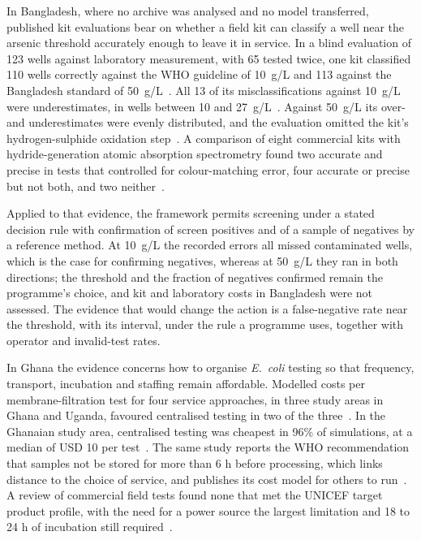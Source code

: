 \documentclass[10pt,letterpaper]{article}
\begin{document}
In Bangladesh, where no archive was analysed and no model transferred, published kit evaluations bear on whether a field kit can classify a well near the arsenic threshold accurately enough to leave it in service. In a blind evaluation of 123 wells against laboratory measurement, with 65 tested twice, one kit classified 110 wells correctly against the WHO guideline of 10~\textmu{}g/L and 113 against the Bangladesh standard of 50~\textmu{}g/L~\cite{George2012}. All 13 of its misclassifications against 10~\textmu{}g/L were underestimates, in wells between 10 and 27~\textmu{}g/L~\cite{George2012}. Against 50~\textmu{}g/L its over- and underestimates were evenly distributed, and the evaluation omitted the kit's hydrogen-sulphide oxidation step~\cite{George2012}. A comparison of eight commercial kits with hydride-generation atomic absorption spectrometry found two accurate and precise in tests that controlled for colour-matching error, four accurate or precise but not both, and two neither~\cite{Reddy2020}.

Applied to that evidence, the framework permits screening under a stated decision rule with confirmation of screen positives and of a sample of negatives by a reference method. At 10~\textmu{}g/L the recorded errors all missed contaminated wells, which is the case for confirming negatives, whereas at 50~\textmu{}g/L they ran in both directions; the threshold and the fraction of negatives confirmed remain the programme's choice, and kit and laboratory costs in Bangladesh were not assessed. The evidence that would change the action is a false-negative rate near the threshold, with its interval, under the rule a programme uses, together with operator and invalid-test rates.

In Ghana the evidence concerns how to organise \textit{E.~coli} testing so that frequency, transport, incubation and staffing remain affordable. Modelled costs per membrane-filtration test for four service approaches, in three study areas in Ghana and Uganda, favoured centralised testing in two of the three~\cite{Trimmer2024}. In the Ghanaian study area, centralised testing was cheapest in 96\% of simulations, at a median of USD 10 per test~\cite{Trimmer2024}. The same study reports the WHO recommendation that samples not be stored for more than 6 h before processing, which links distance to the choice of service, and publishes its cost model for others to run~\cite{Trimmer2024}. A review of commercial field tests found none that met the UNICEF target product profile, with the need for a power source the largest limitation and 18 to 24 h of incubation still required~\cite{Pichel2023}.
\end{document}
